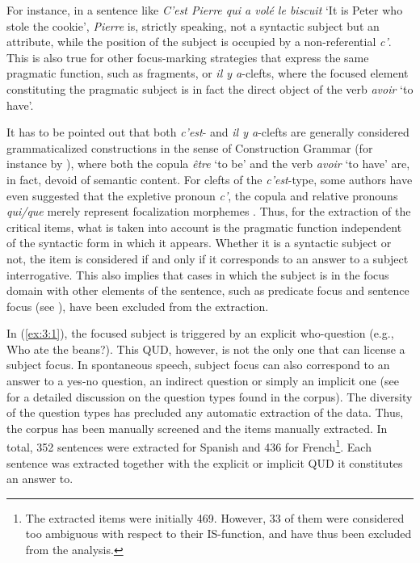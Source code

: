 For instance, in a sentence like \textit{C'est Pierre qui a volé le biscuit} `It is Peter who stole the cookie', \textit{Pierre} is, strictly speaking, not a syntactic subject but an attribute, while the position of the subject is occupied by a non-referential \textit{c'}. This is also true for other focus-marking strategies that express the same pragmatic function, such as fragments, or \textit{il y a}-clefts, where the focused element constituting the pragmatic subject is in fact the direct object of the verb \textit{avoir} `to have'.

It has to be pointed out that both \textit{c'est}- and \textit{il y a}-clefts are generally considered grammaticalized constructions in the sense of Construction Grammar (for instance by \cite{lambrecht1996information}), where both the copula \textit{être} `to be' and the verb  \textit{avoir} `to have' are, in fact, devoid of semantic content. For clefts of the \textit{c'est}-type, some authors have even suggested that the expletive pronoun \textit{c'}, the copula and relative pronouns \textit{qui/que} merely represent  focalization morphemes \parencite[197]{wehr2011phrase}. Thus, for the extraction of the critical items, what is taken into account is the pragmatic function independent of the syntactic form in which it appears. Whether it is a syntactic subject or not, the item is considered if and only if it corresponds to an answer to a subject interrogative.
This also implies that cases in which the subject is in the focus domain with other elements of the sentence, such as predicate focus and sentence focus (see ), have been excluded from the extraction.

In (\ref{ex:3:1}), the focused subject is triggered by an explicit who-question (e.g., Who ate the beans?). This QUD, however, is not the only one that can license a subject focus. In spontaneous speech, subject focus can also correspond to an answer to a yes-no question, an indirect question or simply an implicit one (see  for a detailed discussion on the question types found in the corpus). The diversity of the question types has precluded any automatic extraction of the data. Thus, the corpus has been manually screened and the items manually extracted. In total, 352 sentences were extracted for Spanish and 436 for French\footnote{The extracted items were initially 469. However, 33 of them were considered too ambiguous with respect to their IS-function, and have thus been excluded from the analysis.}. Each sentence was extracted together with the explicit or implicit QUD it constitutes an answer to.


